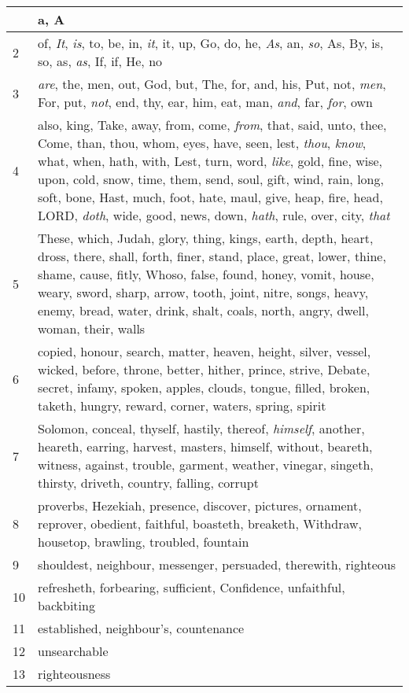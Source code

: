 \begin{center}
\begin{longtable}{l|p{3.75in}}
\hline \hline 
\endlastfoot 
1 & a, A\\ \hline 
2 & of, \emph{It}, \emph{is}, to, be, in, \emph{it}, it, up, Go, do, he, \emph{As}, an, \emph{so}, As, By, is, so, as, \emph{as}, If, if, He, no\\ \hline 
3 & \emph{are}, the, men, out, God, but, The, for, and, his, Put, not, \emph{men}, For, put, \emph{not}, end, thy, ear, him, eat, man, \emph{and}, far, \emph{for}, own\\ \hline 
4 & also, king, Take, away, from, come, \emph{from}, that, said, unto, thee, Come, than, thou, whom, eyes, have, seen, lest, \emph{thou}, \emph{know}, what, when, hath, with, Lest, turn, word, \emph{like}, gold, fine, wise, upon, cold, snow, time, them, send, soul, gift, wind, rain, long, soft, bone, Hast, much, foot, hate, maul, give, heap, fire, head, LORD, \emph{doth}, wide, good, news, down, \emph{hath}, rule, over, city, \emph{that}\\ \hline 
5 & These, which, Judah, glory, thing, kings, earth, depth, heart, dross, there, shall, forth, finer, stand, place, great, lower, thine, shame, cause, fitly, Whoso, false, found, honey, vomit, house, weary, sword, sharp, arrow, tooth, joint, nitre, songs, heavy, enemy, bread, water, drink, shalt, coals, north, angry, dwell, woman, their, walls\\ \hline 
6 & copied, honour, search, matter, heaven, height, silver, vessel, wicked, before, throne, better, hither, prince, strive, Debate, secret, infamy, spoken, apples, clouds, tongue, filled, broken, taketh, hungry, reward, corner, waters, spring, spirit\\ \hline 
7 & Solomon, conceal, thyself, hastily, thereof, \emph{himself}, another, heareth, earring, harvest, masters, himself, without, beareth, witness, against, trouble, garment, weather, vinegar, singeth, thirsty, driveth, country, falling, corrupt\\ \hline 
8 & proverbs, Hezekiah, presence, discover, pictures, ornament, reprover, obedient, faithful, boasteth, breaketh, Withdraw, housetop, brawling, troubled, fountain\\ \hline 
9 & shouldest, neighbour, messenger, persuaded, therewith, righteous\\ \hline 
10 & refresheth, forbearing, sufficient, Confidence, unfaithful, backbiting\\ \hline 
11 & established, neighbour's, countenance\\ \hline 
12 & unsearchable\\ \hline 
13 & righteousness\\ \hline 
\end{longtable} 
\end{center} 




 
